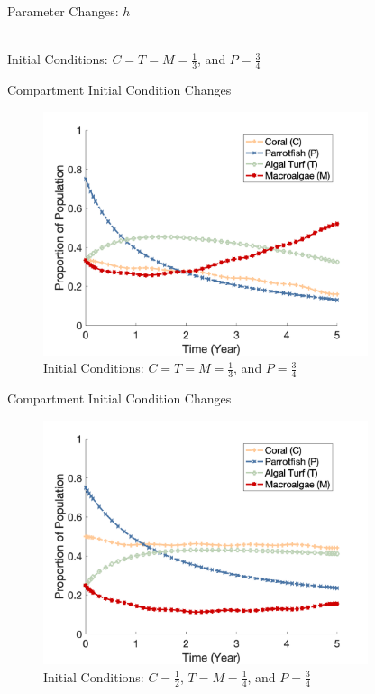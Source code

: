 \documentclass{beamer}
\begin{document}
\begin{frame}{Parameter Changes: $h$}
    \begin{center}
        \\
        Initial Conditions: $C = T = M = \frac{1}{3}$, and $P = \frac{3}{4}$
    \end{center}
\end{frame}

\begin{frame}{Compartment Initial Condition Changes}
    \begin{figure}
        \centering
        \includegraphics[width=0.85\textwidth]{Latex/Figures/Graphs/0.3C_0.3T_0.3M.png}
        \caption{Initial Conditions: $C = T = M = \frac{1}{3}$, and $P = \frac{3}{4}$}
        \label{fig:initial_plot}
    \end{figure}
\end{frame}

\begin{frame}{Compartment Initial Condition Changes}
    \begin{figure}
        \centering
        \includegraphics[width=0.85\textwidth]{Latex/Figures/Graphs/0.5C_0.25T_0.25M.png}
        \caption{Initial Conditions: $C = \frac{1}{2}$, $T = M = \frac{1}{4}$, and $P = \frac{3}{4}$}
        \label{fig:coral_dominant}
    \end{figure}
\end{frame}
\end{document}
